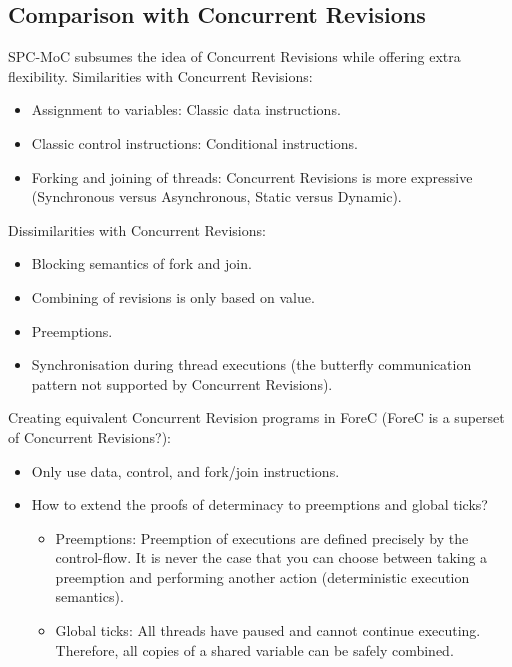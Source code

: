 
\subsection{Comparison with Concurrent Revisions}
SPC-MoC subsumes the idea of Concurrent Revisions while offering extra flexibility.
Similarities with Concurrent Revisions:
\begin{itemize}
	\item Assignment to variables: Classic data instructions.
	\item Classic control instructions: Conditional instructions.
	\item Forking and joining of threads: Concurrent Revisions is more expressive
		  (Synchronous versus Asynchronous, Static versus Dynamic).
\end{itemize}
Dissimilarities with Concurrent Revisions:
\begin{itemize}
	\item Blocking semantics of fork and join.
	\item Combining of revisions is only based on value.
	\item Preemptions.
	\item Synchronisation during thread executions (the butterfly communication pattern not 
		  supported by Concurrent Revisions).
\end{itemize}

Creating equivalent Concurrent Revision programs in ForeC (ForeC is a superset of 
Concurrent Revisions?):
\begin{itemize}
	\item Only use data, control, and fork/join instructions.
	\item How to extend the proofs of determinacy to preemptions and global ticks?
	\begin{itemize}
		\item Preemptions: Preemption of executions are defined precisely by the control-flow.
			  It is never the case that you can choose between taking a preemption and performing
			  another action (deterministic execution semantics).
		\item Global ticks: All threads have paused and cannot continue executing. Therefore, 
			  all copies of a shared variable can be safely combined.
	\end{itemize}
\end{itemize}